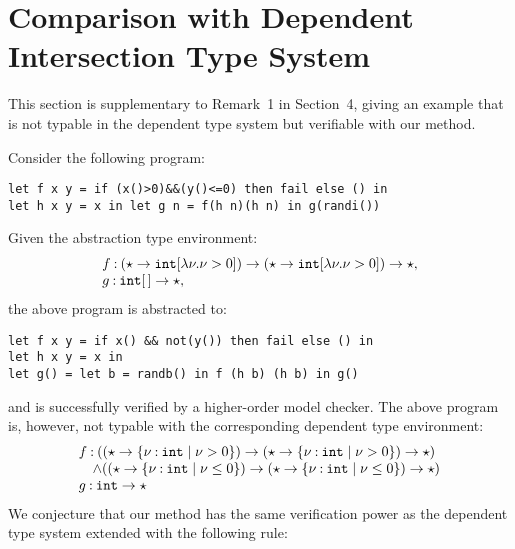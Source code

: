 \section{Comparison with Dependent Intersection Type System}
\label{sec:comparison-with-dit}

This section is supplementary to Remark~1 in Section~4,
giving an example that is not typable in the dependent type system but
verifiable with our method. 

Consider the following program:
\begin{verbatim}
let f x y = if (x()>0)&&(y()<=0) then fail else () in
let h x y = x in let g n = f(h n)(h n) in g(randi())
\end{verbatim}
Given the abstraction type environment: 
\[
\begin{array}{l}
f\mathbin{:} (\star\rightarrow \texttt{int}[\lambda \nu.\nu>0]) \rightarrow (\star\rightarrow \texttt{int}[\lambda \nu.\nu>0]) \rightarrow \star,\\
  g\mathbin{:} \texttt{int}[\,] \rightarrow \star,
\end{array}\]
the above program is abstracted to:
\begin{verbatim}
let f x y = if x() && not(y()) then fail else () in
let h x y = x in
let g() = let b = randb() in f (h b) (h b) in g()
\end{verbatim}
and is successfully verified by a higher-order model checker.
The above program is, however, not typable with the corresponding dependent type environment:
\[
\begin{array}{l}
f\mathbin{:} ((\star\rightarrow \{\nu\mathbin{:} \texttt{int}\mid \nu>0\}) \rightarrow (\star\rightarrow \{\nu\mathbin{:} \texttt{int}\mid \nu>0\})\rightarrow \star)\\
\quad\land ((\star\rightarrow \{\nu\mathbin{:} \texttt{int}\mid \nu\leq 0\}) \rightarrow (\star\rightarrow \{\nu\mathbin{:} \texttt{int}\mid \nu\leq 0\})\rightarrow \star)\\
g\mathbin{:} \texttt{int} \rightarrow \star
\end{array}
\]
We conjecture that our method has the same verification power as
the dependent type system extended with the following rule:
  {}

